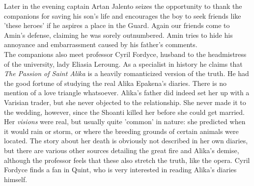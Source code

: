 Later in the evening captain Artan Jalento seizes the opportunity to thank the companions for saving his son's life and encourages the boy to seek friends like 'these heroes' if he aspires a place in the Guard. Again our friends come to Amin's defense, claiming he was sorely outnumbered. Amin tries to hide his annoyance and embarrassment caused by his father's comments.\\

The companions also meet professor Cyril Fordyce, husband to the headmistress of the university, lady Eliasia Leroung. As a specialist in history he claims that {\itshape The Passion of Saint Alika} is a heavily romanticized version of the truth. He had the good fortune of studying the real Alika Epakena's diaries. There is no mention of a love triangle whatsoever. Alika's father did indeed set her up with a Varisian trader, but she never objected to the relationship. She never made it to the wedding, however, since the Shoanti killed her before she could get married. Her  {\itshape visions} were real, but usually quite 'common' in nature: she predicted when it would rain or storm, or where the breeding grounds of certain animals were located. The story about her death is obviously not described in her own diaries, but there are various other sources detailing the great fire and Alika's demise, although the professor feels that these also stretch the truth, like the opera. Cyril Fordyce finds a fan in Quint, who is very interested in reading Alika's diaries himself. 